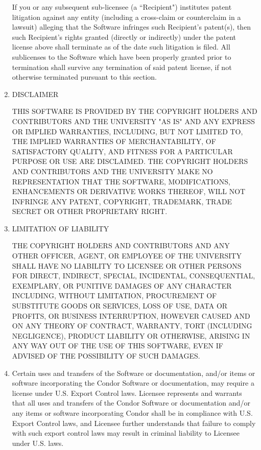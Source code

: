 \begin{enumerate}
   If you or any subsequent sub-licensee (a ``Recipient") institutes
   patent litigation against any entity (including a cross-claim or
   counterclaim in a lawsuit) alleging that the Software infringes
   such Recipient's patent(s), then such Recipient's rights granted
   (directly or indirectly) under the patent license above shall
   terminate as of the date such litigation is filed.  All
   sublicenses to the Software which have been properly granted prior
   to termination shall survive any termination of said patent
   license, if not otherwise terminated pursuant to this section.

\item DISCLAIMER

   THIS SOFTWARE IS PROVIDED BY THE COPYRIGHT HOLDERS AND CONTRIBUTORS
   AND THE UNIVERSITY "AS IS" AND ANY EXPRESS OR IMPLIED WARRANTIES,
   INCLUDING, BUT NOT LIMITED TO, THE IMPLIED WARRANTIES OF
   MERCHANTABILITY, OF SATISFACTORY QUALITY, AND FITNESS FOR A
   PARTICULAR PURPOSE OR USE ARE DISCLAIMED.  THE COPYRIGHT HOLDERS
   AND CONTRIBUTORS AND THE UNIVERSITY MAKE NO REPRESENTATION THAT THE
   SOFTWARE, MODIFICATIONS, ENHANCEMENTS OR DERIVATIVE WORKS THEREOF,
   WILL NOT INFRINGE ANY PATENT, COPYRIGHT, TRADEMARK, TRADE SECRET OR
   OTHER PROPRIETARY RIGHT.

\item LIMITATION OF LIABILITY

   THE COPYRIGHT HOLDERS AND CONTRIBUTORS AND ANY OTHER OFFICER,
   AGENT, OR EMPLOYEE OF THE UNIVERSITY SHALL HAVE NO LIABILITY TO
   LICENSEE OR OTHER PERSONS FOR DIRECT, INDIRECT, SPECIAL,
   INCIDENTAL, CONSEQUENTIAL, EXEMPLARY, OR PUNITIVE DAMAGES OF ANY
   CHARACTER INCLUDING, WITHOUT LIMITATION, PROCUREMENT OF SUBSTITUTE
   GOODS OR SERVICES, LOSS OF USE, DATA OR PROFITS, OR BUSINESS
   INTERRUPTION, HOWEVER CAUSED AND ON ANY THEORY OF CONTRACT,
   WARRANTY, TORT (INCLUDING NEGLIGENCE), PRODUCT LIABILITY OR
   OTHERWISE, ARISING IN ANY WAY OUT OF THE USE OF THIS SOFTWARE,
   EVEN IF ADVISED OF THE POSSIBILITY OF SUCH DAMAGES.
   
\item Certain uses and transfers of the Software or documentation, and/or
   items or software incorporating the Condor Software or
   documentation, may require a license under U.S. Export Control
   laws.  Licensee represents and warrants that all uses and transfers
   of the Condor Software or documentation and/or any items or
   software incorporating Condor shall be in compliance with U.S.
   Export Control laws, and Licensee further understands that failure
   to comply with such export control laws may result in criminal
   liability to Licensee under U.S. laws.
   

\end{enumerate}
